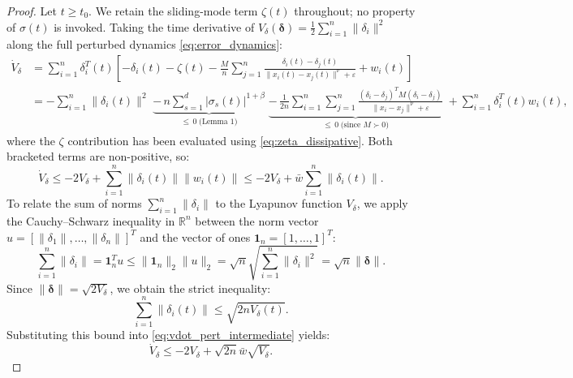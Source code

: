 \documentclass[11pt]{article}
\begin{document}
\begin{proof}
Let $t \ge t_0$. We retain the sliding-mode term $\zeta(t)$ throughout; no property of $\sigma(t)$ is invoked. Taking the time derivative of $V_\delta(\boldsymbol{\delta}) = \frac{1}{2}\sum_{i=1}^{n}\|\delta_i\|^2$ along the full perturbed dynamics \eqref{eq:error_dynamics}:
\begin{align}
\dot{V}_\delta &= \sum_{i=1}^{n}\delta_i^T(t) \left[ -\delta_i(t) - \zeta(t) - \frac{M}{n}\sum_{j=1}^{n}\frac{\delta_i(t) - \delta_j(t)}{\|x_i(t) - x_j(t)\|^\nu + \varepsilon} + w_i(t) \right] \nonumber \\
&= -\sum_{i=1}^{n}\|\delta_i(t)\|^2 \; \underbrace{-\, n\sum_{s=1}^{d}|\sigma_s(t)|^{1+\beta}}_{\le\, 0 \;\text{(Lemma 1)}} \; \underbrace{-\, \frac{1}{2n}\sum_{i=1}^{n}\sum_{j=1}^{n}\frac{(\delta_i - \delta_j)^T M (\delta_i - \delta_j)}{\|x_i - x_j\|^\nu + \varepsilon}}_{\le\, 0 \;\text{(since } M \succ 0)} \; + \sum_{i=1}^{n}\delta_i^T(t) w_i(t),
\end{align}
where the $\zeta$ contribution has been evaluated using \eqref{eq:zeta_dissipative}. Both bracketed terms are non-positive, so:
\begin{equation}
\dot{V}_\delta \le -2 V_\delta + \sum_{i=1}^{n} \|\delta_i(t)\| \|w_i(t)\| \le -2 V_\delta + \bar{w}\sum_{i=1}^{n}\|\delta_i(t)\|.
\label{eq:vdot_pert_intermediate}
\end{equation}
To relate the sum of norms $\sum_{i=1}^{n}\|\delta_i\|$ to the Lyapunov function $V_\delta$, we apply the Cauchy--Schwarz inequality in $\mathbb{R}^n$ between the norm vector $u = [\|\delta_1\|, \dots, \|\delta_n\|]^T$ and the vector of ones $\mathbf{1}_n = [1, \dots, 1]^T$:
\begin{equation}
\sum_{i=1}^{n}\|\delta_i\| = \mathbf{1}_n^T u \le \|\mathbf{1}_n\|_2 \|u\|_2 = \sqrt{n}\sqrt{\sum_{i=1}^{n}\|\delta_i\|^2} = \sqrt{n}\|\boldsymbol{\delta}\|.
\end{equation}
Since $\|\boldsymbol{\delta}\| = \sqrt{2V_\delta}$, we obtain the strict inequality:
\begin{equation}
\sum_{i=1}^{n}\|\delta_i(t)\| \le \sqrt{2n V_\delta(t)}.
\end{equation}
Substituting this bound into \eqref{eq:vdot_pert_intermediate} yields:
\begin{equation}
\dot{V}_\delta \le -2 V_\delta + \sqrt{2n}\bar{w}\sqrt{V_\delta}.
\label{eq:vdot_iss_inequality}
\end{equation}


\end{proof}
\end{document}
